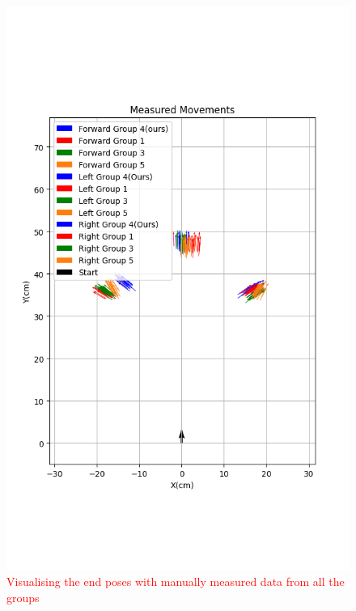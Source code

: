 {        \begin{figure}[!ht] 
            \centering \includegraphics[scale=.60]{"images/experiment_2/3.merged-end-poses.png"}
            \caption{\textcolor{red}{Visualising the end poses with manually measured data from all the groups}}
            \label{fig:merged-end-poses}
        \end{figure}
    
}
